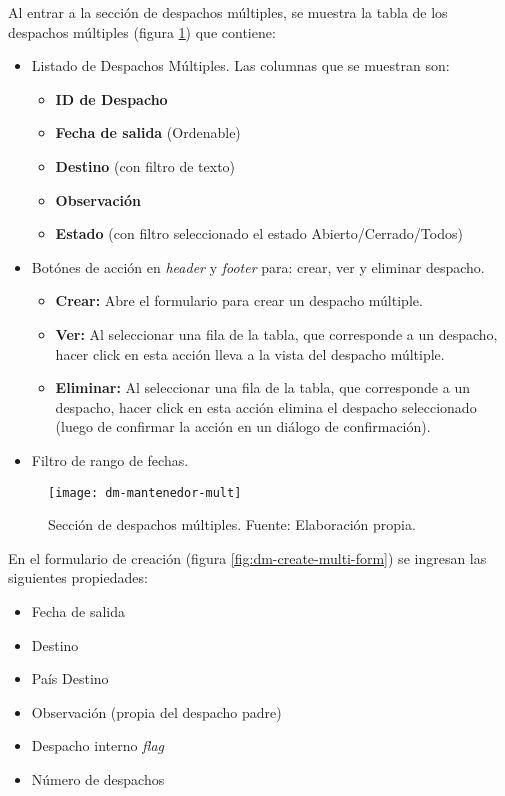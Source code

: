 Al entrar a la sección de despachos múltiples, se muestra la tabla de los despachos múltiples (figura \ref{fig:dm-mantenedor-mult}) que contiene:
\begin{itemize}
    \item Listado de Despachos Múltiples. Las columnas que se muestran son:
    \begin{itemize}
        \item \textbf{ID de Despacho}
        \item \textbf{Fecha de salida} (Ordenable)
        \item \textbf{Destino} (con filtro de texto)
        \item \textbf{Observación}
        \item \textbf{Estado} (con filtro seleccionado el estado Abierto/Cerrado/Todos)
    \end{itemize}
    \item Botónes de acción en \textit{header} y \textit{footer} para: crear, ver y eliminar despacho.
    \begin{itemize}
        \item \textbf{Crear:} Abre el formulario para crear un despacho múltiple.
        \item \textbf{Ver:} Al seleccionar una fila de la tabla, que corresponde a un despacho, hacer click en esta acción lleva a la vista del despacho múltiple.
        \item \textbf{Eliminar:} Al seleccionar una fila de la tabla, que corresponde a un despacho, hacer click en esta acción elimina el despacho seleccionado (luego de confirmar la acción en un diálogo de confirmación).
    \end{itemize}
    \item Filtro de rango de fechas.
\end{itemize}

\begin{figure}[H]
	\centering
	\texttt{[image: dm-mantenedor-mult]}
	\caption{\label{fig:dm-mantenedor-mult} Sección de despachos múltiples. Fuente: Elaboración propia.}
\end{figure}

En el formulario de creación (figura \ref{fig:dm-create-multi-form}) se ingresan las siguientes propiedades:
\begin{itemize}
    \item Fecha de salida
    \item Destino
    \item País Destino
    \item Observación (propia del despacho padre)
    \item Despacho interno \textit{flag}    
    \item Número de despachos
\end{itemize}

